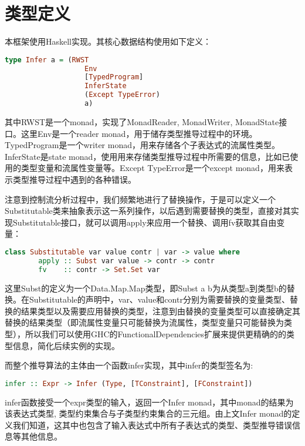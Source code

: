 \documentclass[UTF8, colorlinks]{pkuthss}
\begin{document}
	\section{类型定义}
	本框架使用Haskell实现。其核心数据结构使用如下定义：
	\begin{lstlisting}[language=haskell]
type Infer a = (RWST
                   Env                
                   [TypedProgram]    
                   InferState         
                   (Except TypeError) 
                   a)                 
	\end{lstlisting}
	其中RWST是一个monad，实现了MonadReader, MonadWriter, MonadState接口。这里Env是一个reader monad，用于储存类型推导过程中的环境。TypedProgram是一个writer monad，用来存储各个子表达式的流属性类型。InferState是state monad，使用用来存储类型推导过程中所需要的信息，比如已使用的类型变量和流属性变量等。Except TypeError是一个except monad，用来表示类型推导过程中遇到的各种错误。
	
	注意到控制流分析过程中，我们频繁地进行了替换操作，于是可以定义一个Substitutable类来抽象表示这一系列操作，以后遇到需要替换的类型，直接对其实现Substitutable接口，就可以调用apply来应用一个替换、调用fv获取其自由变量：
	\begin{lstlisting}[language=haskell]
class Substitutable var value contr | var -> value where
    	apply :: Subst var value -> contr -> contr
    	fv    :: contr -> Set.Set var
	\end{lstlisting}
	
	这里Subst的定义为一个Data.Map.Map类型，即Subst a b为从类型a到类型b的替换。在Substitutable的声明中，var、value和contr分别为需要替换的变量类型、替换的结果类型以及需要应用替换的类型，注意到由替换的变量类型可以直接确定其替换的结果类型（即流属性变量只可能替换为流属性，类型变量只可能替换为类型），所以我们可以使用GHC的FunctionalDependencies扩展\cite{fundep}来提供更精确的的类型信息，简化后续实例的实现。
	
	而整个推导算法的主体由一个函数infer实现，其中infer的类型签名为:
	\begin{lstlisting}[language=haskell]
infer :: Expr -> Infer (Type, [TConstraint], [FConstraint])
	\end{lstlisting}
	infer函数接受一个expr类型的输入，返回一个Infer monad，其中monad的结果为该表达式类型, 类型约束集合与子类型约束集合的三元组。由上文Infer monad的定义我们知道，这其中也包含了输入表达式中所有子表达式的类型、类型推导错误信息等其他信息。
\end{document}
